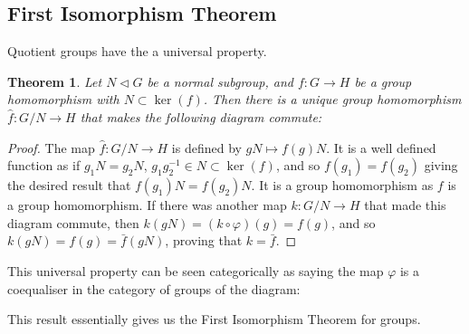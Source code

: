 \documentclass[12pt]{report}
\newenvironment{bluebox}{\begin{tcolorbox}[colback=blue!5!white,colframe=blue!75!black]}{\end{tcolorbox}}
\renewcommand{\phi}{\varphi}
\newtheorem{theorem}{Theorem}[section] %
\theoremstyle{definition}
\newenvironment{centre}{\begin{center}}{\end{center}}
\newenvironment{categorybox}{\begin{bluebox}}{\end{bluebox}}
\begin{document}
\subsection{First Isomorphism Theorem}\label{sec:group-theory:first-isom-theorem}

Quotient groups have the a universal property.

\begin{theorem}\label{thm:group-theory:universal-property-of-quotient-groups}
  Let \(N \triangleleft G\) be a normal subgroup, and \(f : G \to H\) be a group homomorphism with \(N \subset \ker(f)\).
  Then there is a unique group homomorphism \(\hat f : G/N \to H\) that makes the following diagram commute:
  \begin{center}
  \end{center}
\end{theorem}

\begin{proof}
  The map \(\hat f: G/N \to H\) is defined by \(gN \mapsto f(g)N\).
  It is a well defined function as if \(g_{1}N = g_{2}N\), \(g_{1}g^{-1}_{2} \in N \subset \ker(f)\), and so \(f(g_{1})=f(g_{2})\) giving the desired result that \(f(g_{1})N = f(g_{2})N\).
  It is a group homomorphism as \(f\) is a group homomorphism.
  If there was another map \(k:G/N \to H\) that made this diagram commute, then \(k(gN) = (k \circ \phi)(g) = f(g)\), and so \(k(gN) = f(g) = \bar f (gN)\), proving that \(k = \bar f\).
\end{proof}

\begin{categorybox}
  This universal property can be seen categorically as saying the map \(\phi\) is a coequaliser in the category of groups of the diagram:

  \begin{centre}
  \end{centre}

\end{categorybox}

This result essentially gives us the First Isomorphism Theorem for groups.
\end{document}
